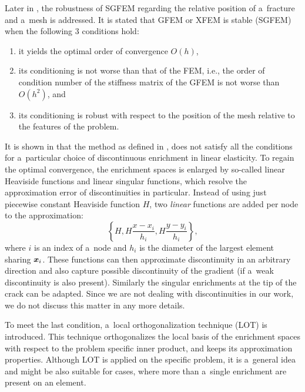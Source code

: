 Later in \cite{zhang_robust_2016}, the robustness of SGFEM regarding the relative position of a~fracture and a~mesh is addressed.
It is stated that GFEM or XFEM is stable (SGFEM) when the following 3 conditions hold:
\begin{enumerate}[label=(\alph*)]
        \item \label{enum:sgfem_conditions_a} it yields the optimal order of convergence $O(h)$,
        \item \label{enum:sgfem_conditions_b} its conditioning is not worse than that of the FEM, i.e., the order of condition number of the stiffness matrix of the
        GFEM is not worse than $O(h^2)$, and
        \item \label{enum:sgfem_conditions_c} its conditioning is robust with respect to the position of the mesh relative to the features of the problem.
\end{enumerate}

It is shown in \cite{zhang_robust_2016} that the method as defined in \cite{babuska_stable_2012,gupta_stable_2013}, %
does not satisfy all the conditions for a~particular choice of discontinuous enrichment in linear elasticity.
To regain the optimal convergence, the enrichment spaces is enlarged by so-called linear Heaviside functions and linear singular functions,
which resolve the approximation error of discontinuities in particular.
Instead of using just piecewise constant Heaviside function $H$, two \emph{linear} functions are added per node to the approximation:
\begin{equation}
    \left\{ H, H\frac{x-x_i}{h_i}, H\frac{y-y_i}{h_i} \right\},
\end{equation}
where $i$ is an index of a~node and $h_i$ is the diameter of the largest element sharing $\mathbf{\boldsymbol{x}}_i$.
These functions can then approximate discontinuity in an arbitrary direction and also capture
possible discontinuity of the gradient (if a~weak discontinuity is also present). Similarly the singular enrichments at the tip of the crack can be adapted.
Since we are not dealing with discontinuities in our work, we do not discuss this matter in any more details.

To meet the last condition, a~local orthogonalization technique (LOT) is introduced.
This technique orthogonalizes the local basis of the enrichment spaces with respect to the problem specific inner product,
and keeps its approximation properties. Although LOT is applied on the specific problem,
it is a~general idea and might be also suitable for cases, where more than a~single enrichment are present on an element.

